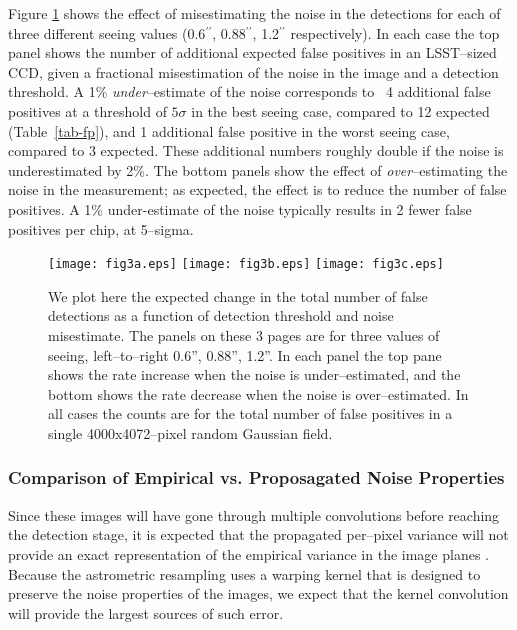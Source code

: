 \documentclass[floatfix, apj]{emulateapj}
\begin{document}
Figure \ref{fig:3} shows the effect of misestimating the noise in the detections for each of three different seeing values (0.6$^{\prime\prime}$, 0.88$^{\prime\prime}$, 1.2$^{\prime\prime}$ respectively).
In each case the top panel shows the number of additional expected false positives in an LSST--sized CCD, given a fractional misestimation of the noise in the image and a detection threshold.
A 1\% {\it under}--estimate of the noise corresponds to ~4 additional false positives at a threshold of $5\sigma$ in the best seeing case, compared to 12 expected (Table~\ref{tab-fp}), and 1 additional false positive in the worst seeing case, compared to 3 expected.
These additional numbers roughly double if the noise is underestimated by 2\%.
The bottom panels show the effect of {\it over}--estimating the noise in the measurement; as expected, the effect is to reduce the number of false positives.
A 1\% under-estimate of the noise typically results in 2 fewer false positives per chip, at 5--sigma.
\begin{figure}[!ht]
  \texttt{[image: fig3a.eps]}
  \texttt{[image: fig3b.eps]}
  \texttt{[image: fig3c.eps]} \\
  \caption[]{ We plot here the expected change in the total number of
    false detections as a function of detection threshold and noise
    misestimate.
    The panels on these 3 pages are for three values of seeing,
    left--to--right 0.6'', 0.88'', 1.2''.
    In each panel the top pane shows the rate increase when the noise
    is under--estimated, and the bottom shows the rate decrease when
    the noise is over--estimated.
    In all cases the counts are for the total number of false
    positives in a single 4000x4072--pixel random Gaussian field.
  }
  \label{fig:3}
\end{figure} 

\subsubsection{Comparison of Empirical vs. Proposagated Noise Properties}



Since these images will have gone through multiple convolutions before reaching the detection stage, it is expected that the propagated per--pixel variance will not provide an exact representation of the empirical variance in the image planes \citep{Price-Stacking}.
Because the astrometric resampling uses a warping kernel that is designed to preserve the noise properties of the images, we expect that the kernel convolution will provide the largest sources of such error.
\end{document}
